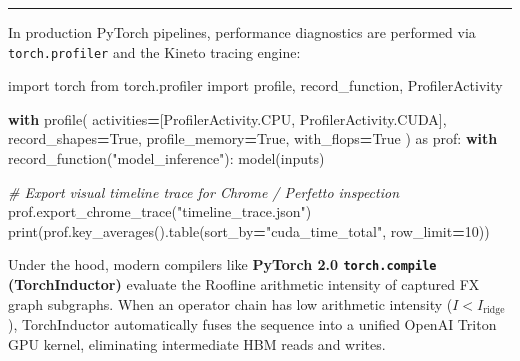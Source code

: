 \documentclass[
  letterpaper,
]{scrbook}
\newenvironment{Shaded}{\begin{snugshade}}{\end{snugshade}}
\newcommand{\BuiltInTok}[1]{#1}
\newcommand{\CommentTok}[1]{\textcolor[rgb]{0.56,0.35,0.01}{\textit{#1}}}
\newcommand{\ControlFlowTok}[1]{\textcolor[rgb]{0.13,0.29,0.53}{\textbf{#1}}}
\newcommand{\DecValTok}[1]{\textcolor[rgb]{0.00,0.00,0.81}{#1}}
\newcommand{\ImportTok}[1]{#1}
\newcommand{\NormalTok}[1]{#1}
\newcommand{\OperatorTok}[1]{\textcolor[rgb]{0.81,0.36,0.00}{\textbf{#1}}}
\newcommand{\StringTok}[1]{\textcolor[rgb]{0.31,0.60,0.02}{#1}}
\newcommand{\VariableTok}[1]{\textcolor[rgb]{0.00,0.00,0.00}{#1}}
\begin{document}
\begin{center}\rule{0.5\linewidth}{0.5pt}\end{center}

\begin{tcolorbox}[enhanced jigsaw, arc=.35mm, bottomrule=.15mm, bottomtitle=1mm, breakable, colback=white, colbacktitle=quarto-callout-note-color!10!white, colframe=quarto-callout-note-color-frame, coltitle=black, left=2mm, leftrule=.75mm, opacityback=0, opacitybacktitle=0.6, rightrule=.15mm, title=\textcolor{quarto-callout-note-color}{\faInfo}\hspace{0.5em}{PyTorch Systems Bridge: \texttt{torch.profiler} and Graph-Level Cost
Models}, titlerule=0mm, toprule=.15mm, toptitle=1mm]

In production PyTorch pipelines, performance diagnostics are performed
via \texttt{torch.profiler} and the Kineto tracing engine:

\begin{Shaded}
\begin{Highlighting}[]
\ImportTok{import}\NormalTok{ torch}
\ImportTok{from}\NormalTok{ torch.profiler }\ImportTok{import}\NormalTok{ profile, record\_function, ProfilerActivity}

\ControlFlowTok{with}\NormalTok{ profile(}
\NormalTok{    activities}\OperatorTok{=}\NormalTok{[ProfilerActivity.CPU, ProfilerActivity.CUDA],}
\NormalTok{    record\_shapes}\OperatorTok{=}\VariableTok{True}\NormalTok{,}
\NormalTok{    profile\_memory}\OperatorTok{=}\VariableTok{True}\NormalTok{,}
\NormalTok{    with\_flops}\OperatorTok{=}\VariableTok{True}
\NormalTok{) }\ImportTok{as}\NormalTok{ prof:}
    \ControlFlowTok{with}\NormalTok{ record\_function(}\StringTok{"model\_inference"}\NormalTok{):}
\NormalTok{        model(inputs)}

\CommentTok{\# Export visual timeline trace for Chrome / Perfetto inspection}
\NormalTok{prof.export\_chrome\_trace(}\StringTok{"timeline\_trace.json"}\NormalTok{)}
\BuiltInTok{print}\NormalTok{(prof.key\_averages().table(sort\_by}\OperatorTok{=}\StringTok{"cuda\_time\_total"}\NormalTok{, row\_limit}\OperatorTok{=}\DecValTok{10}\NormalTok{))}
\end{Highlighting}
\end{Shaded}

Under the hood, modern compilers like \textbf{PyTorch 2.0
\texttt{torch.compile} (TorchInductor)} evaluate the Roofline arithmetic
intensity of captured FX graph subgraphs. When an operator chain has low
arithmetic intensity (\(I < I_{\text{ridge}}\)), TorchInductor
automatically fuses the sequence into a unified OpenAI Triton GPU
kernel, eliminating intermediate HBM reads and writes.

\end{tcolorbox}
\end{document}
